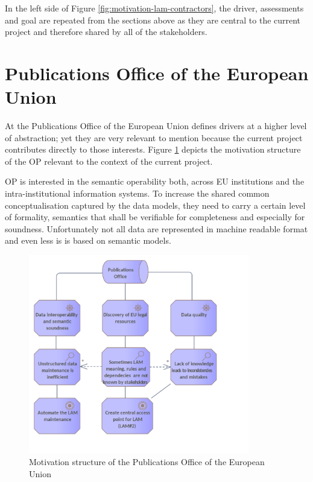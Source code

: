 	In the left side of Figure \ref{fig:motivation-lam-contractors}, the driver, assessments and goal are repeated from the sections above as they are central to the current project and therefore shared by all of the stakeholders. 


	\section{Publications Office of the European Union}
	
	At the Publications Office of the European Union defines drivers at a higher level of abstraction; yet they are very relevant to mention because the current project contributes directly to those interests. Figure \ref{fig:motivation-op} depicts the motivation structure of the OP relevant to the context of the current project. 
	
	OP is interested in the semantic operability both, across EU institutions and the intra-institutional information systems. To increase the shared common conceptualisation captured by the data models, they need to carry a certain level of formality, semantics that shall be verifiable for completeness and especially for soundness. Unfortunately not all data are represented in machine readable format and even less is is based on semantic models. 
	
	\begin{figure}[!h]
		\centering
		\includegraphics[width=0.859\textwidth]{images/motivation/OP level motivation (higher).png}
		\caption{Motivation structure of the Publications Office of the European Union}
		\label{fig:motivation-op}
	\end{figure}
	
